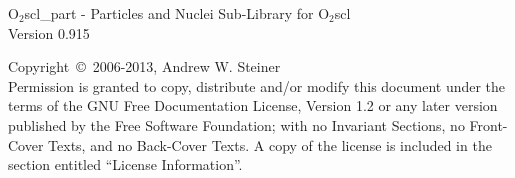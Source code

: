 \documentclass{article}
\begin{document}
\hypersetup{pageanchor=false,citecolor=blue}

\begin{titlepage}
\vspace*{7cm}
\begin{center}
{\huge O$_2$scl\_part - Particles and Nuclei Sub-Library for O$_2$scl
\\[1ex]\large Version 0.915}\\
\end{center}
\vfill
Copyright~{\copyright}~2006-2013,
Andrew W. Steiner \\
Permission is granted to copy, distribute and/or modify this document
under the terms of the GNU Free Documentation License, Version 1.2 or
any later version published by the Free Software Foundation; with no
Invariant Sections, no Front-Cover Texts, and no Back-Cover Texts.  A
copy of the license is included in the section entitled ``License
Information''.
\end{titlepage}

\tableofcontents
{}
\hypersetup{pageanchor=true,citecolor=blue}
\end{document}
